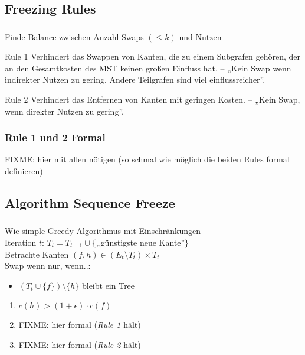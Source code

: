 \subsection{Freezing Rules}
\begin{frame}
    \frametitle{\insertsubsection}
    \underline{Finde Balance zwischen Anzahl Swaps $(\leq k)$ und Nutzen}\\
    \vspace{1em}
    \begin{block}{Rule 1}
        Verhindert das Swappen von Kanten, die zu einem Subgrafen gehören, der an den Gesamtkosten des MST keinen großen Einfluss hat. -- „Kein Swap wenn indirekter Nutzen zu gering. Andere Teilgrafen sind viel einflussreicher”.
    \end{block}
    \vspace{1em}
    \begin{block}{Rule 2}
        Verhindert das Entfernen von Kanten mit geringen Kosten. -- „Kein Swap, wenn direkter Nutzen zu gering”.
    \end{block}
\end{frame}

\begin{frame}
    \frametitle{Rule 1 und 2 Formal}
    FIXME: hier mit allen nötigen (so schmal wie möglich die beiden Rules formal definieren)
\end{frame}

\subsection{Algorithm Sequence Freeze}
\begin{frame}
    \frametitle{\insertsubsection}
    \underline{Wie simple Greedy Algorithmus mit Einschränkungen}\\
    \vspace{1em}
    Iteration $t$: $T_t = T_{t-1} \cup \{$„günstigste neue Kante”$\}$\\
    \vspace{1em}
    Betrachte Kanten $(f, h) \in (E_t \setminus T_t) \times T_t$\\
    Swap wenn nur, wenn..:
    \vspace{1em}
    \begin{itemize}
        \itemsep\setlength{1em}
        \item $(T_t \cup \{f\}) \setminus \{h\}$ bleibt ein Tree
    \end{itemize}
    \begin{enumerate}
        \itemsep\setlength{1em}
        \item $c(h) > (1+\epsilon) \cdot c(f)$
        \item FIXME: hier formal (\emph{Rule 1} hält)
        \item FIXME: hier formal (\emph{Rule 2} hält)
    \end{enumerate}
\end{frame}

